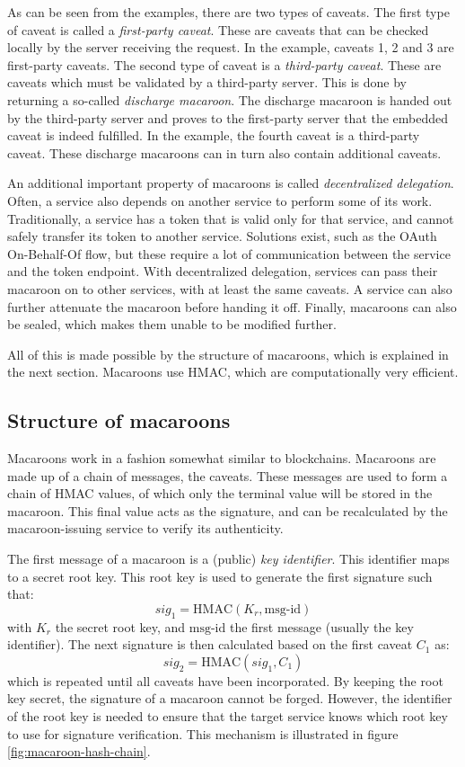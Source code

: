 As can be seen from the examples, there are two types of caveats. The first type of caveat is called a \textit{first-party caveat}. These are caveats that can be checked locally by the server receiving the request. In the example, caveats 1, 2 and 3 are first-party caveats. 
The second type of caveat is a \textit{third-party caveat}. These are caveats which must be validated by a third-party server. This is done by returning a so-called \textit{discharge macaroon}. The discharge macaroon is handed out by the third-party server and proves to the first-party server that the embedded caveat is indeed fulfilled. In the example, the fourth caveat is a third-party caveat. These discharge macaroons can in turn also contain additional caveats.

An additional important property of macaroons is called \textit{decentralized delegation}. Often, a service also depends on another service to perform some of its work. Traditionally, a service has a token that is valid only for that service, and cannot safely transfer its token to another service. Solutions exist, such as the OAuth On-Behalf-Of flow, but these require a lot of communication between the service and the token endpoint. With decentralized delegation, services can pass their macaroon on to other services, with at least the same caveats. A service can also further attenuate the macaroon before handing it off. Finally, macaroons can also be sealed, which makes them unable to be modified further. 

All of this is made possible by the structure of macaroons, which is explained in the next section. Macaroons use \acrfull{HMAC}, which are computationally very efficient.

\newpage
\subsection{Structure of macaroons}
Macaroons work in a fashion somewhat similar to blockchains. Macaroons are made up of a chain of messages, the caveats. These messages are used to form a chain of \gls{HMAC} values, of which only the terminal value will be stored in the macaroon. This final value acts as the signature, and can be recalculated by the macaroon-issuing service to verify its authenticity. 

The first message of a macaroon is a (public) \textit{key identifier}. This identifier maps to a secret root key. This root key is used to generate the first signature such that: $$sig_1 = \text{HMAC}(K_r, \text{msg-id})$$
with $K_r$ the secret root key, and $\text{msg-id}$ the first message (usually the key identifier). The next signature is then calculated based on the first caveat $C_1$ as: $$sig_2 = \text{HMAC}(sig_1, C_1)$$
which is repeated until all caveats have been incorporated. By keeping the root key secret, the signature of a macaroon cannot be forged. However, the identifier of the root key is needed to ensure that the target service knows which root key to use for signature verification. This mechanism is illustrated in figure \ref{fig:macaroon-hash-chain}.

